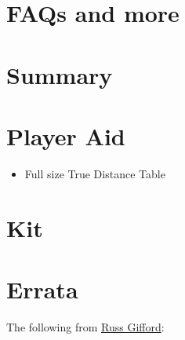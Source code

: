 \documentclass[10pt]{article}
\begin{document}
\begin{multicols}{2}
\section{FAQs and more}

\section{Summary}

\end{multicols}

\section*{Player Aid}

\begin{itemize}
  \item Full size True Distance Table
\end{itemize}

\section*{Kit}

\section{Errata}

The following from \href{http://www.russgifford.net/db_pages/game_starforce.htm}{Russ Gifford}:
\end{document}
